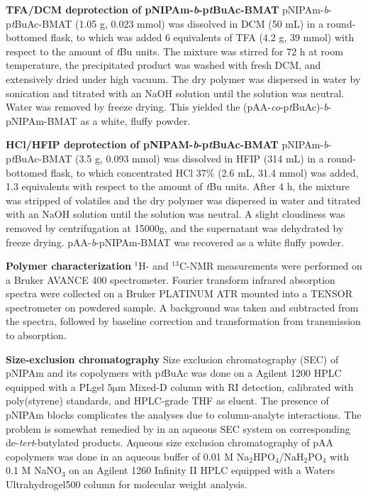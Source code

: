 \documentclass{article}
\begin{document}
\textbf{TFA/DCM deprotection of pNIPAm-\emph{b}-p\emph{t}BuAc-BMAT}
pNIPAm-\emph{b}-p\emph{t}BuAc-BMAT (1.05 g, 0.023 mmol) was dissolved in DCM (50 mL) in a round-bottomed flask, 
to which was added 6 equivalents of TFA (4.2 g, 39 mmol) with respect to the amount of \emph{t}Bu units.
The mixture was stirred for 72 h at room temperature, the precipitated product was washed with fresh DCM,
and extensively dried under high vacuum. The dry polymer was dispersed in water by sonication and 
titrated with an NaOH solution until the solution was neutral. Water was removed by freeze drying.
This yielded the (pAA-\emph{co}-p\emph{t}BuAc)-\emph{b}-pNIPAm-BMAT as a white, fluffy powder.

\textbf{HCl/HFIP deprotection of pNIPAM-\emph{b}-p\emph{t}BuAc-BMAT}
pNIPAm-\emph{b}-p\emph{t}BuAc-BMAT (3.5 g, 0.093 mmol) was dissolved in HFIP (314 mL) in a round-bottomed flask,
to which concentrated HCl 37\% (2.6 mL, 31.4 mmol) was added, 1.3 equivalents with respect to 
the amount of \emph{t}Bu units. After 4 h, the mixture was stripped of volatiles and the dry polymer was dispersed in 
water and titrated with an NaOH solution until the solution was neutral. A slight cloudiness was removed by
centrifugation at 15000g, and the supernatant was dehydrated by freeze drying. pAA-\emph{b}-pNIPAm-BMAT was
recovered as a white fluffy powder.

\textbf{Polymer characterization}
$^1$H- and $^{13}$C-NMR measurements were performed on a Bruker AVANCE 400 spectrometer. 
Fourier transform infrared absorption spectra were collected on a Bruker PLATINUM ATR mounted into a TENSOR
spectrometer on powdered sample. A background was taken and subtracted from the spectra, followed by
baseline correction and transformation from transmission to absorption.

\textbf{Size-exclusion chromatography}
Size exclusion chromatography (SEC) 
of pNIPAm and its copolymers with p\emph{t}BuAc was done on a Agilent 1200 
HPLC equipped with a PLgel $5 \mathrm{\mu m}$ 
Mixed-D column with RI detection, calibrated with poly(styrene) standards, and HPLC-grade 
THF as eluent. The presence of pNIPAm blocks complicates the analyses due to 
column-analyte interactions. The problem is somewhat remedied by in an 
aqueous SEC system on corresponding de-\emph{tert}-butylated products. Aqueous size 
exclusion chromatography of pAA copolymers was done in an aqueous buffer of 
0.01 M Na$_2$HPO$_4$/NaH$_2$PO$_4$ with 0.1 M NaNO$_3$ on an Agilent 1260 Infinity 
II HPLC equipped with a Waters Ultrahydrogel500 column for molecular weight analysis. 
\end{document}
